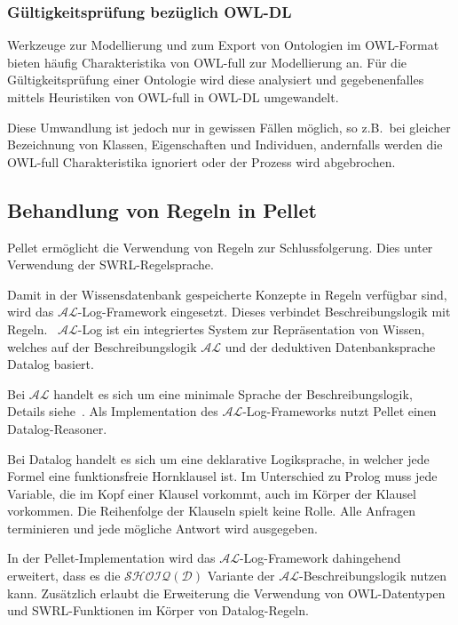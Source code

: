 \subsubsection{Gültigkeitsprüfung bezüglich OWL-DL}
\label{ssubsection:inferenz_pellet_owldl}
Werkzeuge zur Modellierung und zum Export von Ontologien im OWL-Format bieten häufig Charakteristika von OWL-full zur Modellierung an. Für die Gültigkeitsprüfung einer Ontologie wird diese analysiert und gegebenenfalles mittels Heuristiken von OWL-full in OWL-DL umgewandelt.

Diese Umwandlung ist jedoch nur in gewissen Fällen möglich, so z.B.\ bei gleicher Bezeichnung von Klassen, Eigenschaften und Individuen, andernfalls werden die OWL-full Charakteristika ignoriert oder der Prozess wird abgebrochen.

\subsection{Behandlung von Regeln in Pellet}
\label{subsection:inferenz_pellet_swrl}
Pellet ermöglicht die Verwendung von Regeln zur Schlussfolgerung. Dies unter Verwendung der SWRL-Regelsprache.

Damit in der Wissensdatenbank gespeicherte Konzepte in Regeln verfügbar sind, wird das $\mathcal{AL}$-Log-Framework eingesetzt. Dieses verbindet Beschreibungslogik mit Regeln.~\cite[Seiten 4 und 5]{sirin:pellet07} $\mathcal{AL}$-Log ist ein integriertes System zur Repräsentation von Wissen, welches auf der Beschreibungslogik $\mathcal{AL}$ und der deduktiven Datenbanksprache Datalog basiert.~\cite{allog}

Bei $\mathcal{AL}$ handelt es sich um eine minimale Sprache der Beschreibungslogik, Details siehe~\cite[Seite 51]{dl:baader2003}. Als Implementation des $\mathcal{AL}$-Log-Frameworks nutzt Pellet einen Datalog-Reasoner.~\cite[Seiten 4 und 5]{sirin:pellet07}

Bei Datalog handelt es sich um eine deklarative Logiksprache, in welcher jede Formel eine funktionsfreie Hornklausel ist. Im Unterschied zu Prolog muss jede Variable, die im Kopf einer Klausel vorkommt, auch im Körper der Klausel vorkommen. Die Reihenfolge der Klauseln spielt keine Rolle. Alle Anfragen terminieren und jede mögliche Antwort wird ausgegeben.~\cite{datalog}

In der Pellet-Implementation wird das $\mathcal{AL}$-Log-Framework dahingehend erweitert, dass es die $\mathcal{SHOIQ}(\mathcal{D})$ Variante  der $\mathcal{AL}$-Beschreibungslogik nutzen kann. Zusätzlich erlaubt die Erweiterung die Verwendung von OWL-Datentypen und SWRL-Funktionen im Körper von Datalog-Regeln.~\cite[Seite 5]{sirin:pellet07}

